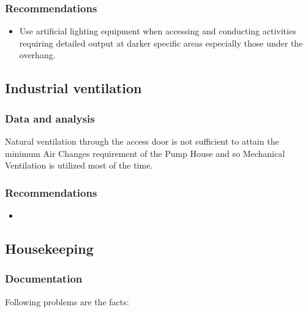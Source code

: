 \subsubsection{Recommendations}

\begin{itemize}
	\item	Use artificial lighting equipment when accessing and conducting activities requiring detailed output at darker specific areas especially those under the overhang.

\end{itemize}


\subsection{Industrial ventilation}\label{aq04}
\subsubsection{Data and analysis}

Natural ventilation through the access door is not sufficient to attain the minimum Air Changes requirement of the Pump House and so Mechanical Ventilation is utilized most of the time.




\subsubsection{Recommendations}

\begin{itemize}
\item 

\end{itemize}




\subsection{Housekeeping}\label{aq05}
\subsubsection{Documentation}
Following problems are the facts:

